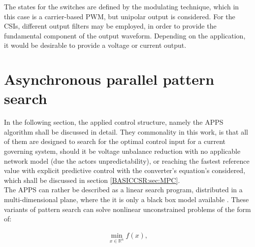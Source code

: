 The states for the switches are defined by the modulating technique, which in this case is a carrier-based PWM, but unipolar output is considered. For the CSIs, different output filters may be employed, in order to provide the fundamental component of the output waveform. Depending on the application, it would be desirable to provide a voltage or current output.

\section{Asynchronous parallel pattern search}\label{BASICUNB:sec:APPS}

In the following section, the applied control structure, namely the APPS algorithm shall be discussed in detail. %
They commonality in this work, is that all of them are designed to search for the optimal control input for a current governing system, should it be voltage unbalance reduction with no applicable network model (due the actors unpredictability), or reaching the fastest reference value with explicit predictive control with the converter's equation's considered, which shall be discussed in section \ref{BASICCSR:sec:MPC}.\\
The APPS can rather be described as a linear search program, distributed in a multi-dimensional plane, where the it is only a black box model available \cite{kolda2003understanding}. These variants of pattern search can solve nonlinear unconstrained problems of the form of:

\begin{equation}
        \begin{array}{c}
            \min_{x\in\mathbb{R}^n}f(x),\\
        \end{array}
        \label{BASICCSR:eqn:currents}
    \end{equation}
		
